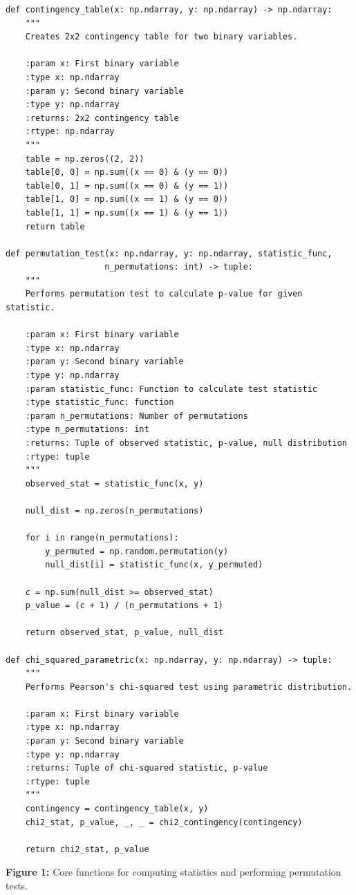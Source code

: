 \begin{verbatim}
def contingency_table(x: np.ndarray, y: np.ndarray) -> np.ndarray:
    """
    Creates 2x2 contingency table for two binary variables.
    
    :param x: First binary variable
    :type x: np.ndarray
    :param y: Second binary variable
    :type y: np.ndarray
    :returns: 2x2 contingency table
    :rtype: np.ndarray
    """
    table = np.zeros((2, 2))
    table[0, 0] = np.sum((x == 0) & (y == 0))
    table[0, 1] = np.sum((x == 0) & (y == 1))
    table[1, 0] = np.sum((x == 1) & (y == 0))
    table[1, 1] = np.sum((x == 1) & (y == 1))
    return table

def permutation_test(x: np.ndarray, y: np.ndarray, statistic_func, 
                    n_permutations: int) -> tuple:
    """
    Performs permutation test to calculate p-value for given statistic.
    
    :param x: First binary variable
    :type x: np.ndarray
    :param y: Second binary variable
    :type y: np.ndarray
    :param statistic_func: Function to calculate test statistic
    :type statistic_func: function
    :param n_permutations: Number of permutations
    :type n_permutations: int
    :returns: Tuple of observed statistic, p-value, null distribution
    :rtype: tuple
    """
    observed_stat = statistic_func(x, y)
    
    null_dist = np.zeros(n_permutations)
    
    for i in range(n_permutations):
        y_permuted = np.random.permutation(y)
        null_dist[i] = statistic_func(x, y_permuted)
    
    c = np.sum(null_dist >= observed_stat)
    p_value = (c + 1) / (n_permutations + 1)
    
    return observed_stat, p_value, null_dist

def chi_squared_parametric(x: np.ndarray, y: np.ndarray) -> tuple:
    """
    Performs Pearson's chi-squared test using parametric distribution.
    
    :param x: First binary variable
    :type x: np.ndarray
    :param y: Second binary variable
    :type y: np.ndarray
    :returns: Tuple of chi-squared statistic, p-value
    :rtype: tuple
    """
    contingency = contingency_table(x, y)
    chi2_stat, p_value, _, _ = chi2_contingency(contingency)
    
    return chi2_stat, p_value
\end{verbatim}

\begin{center}
\textbf{Figure 1:} Core functions for computing statistics and performing permutation tests.
\end{center}

